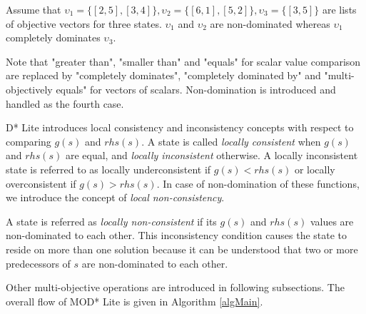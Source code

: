 \documentclass[10pt,journal]{IEEEtran}
\newenvironment{definition}[1][Definition]{\begin{trivlist}
\item[\hskip \labelsep {\bfseries #1}]}{\end{trivlist}}
\begin{document}
Assume that $\upsilon_{1}=\{[2,5],[3,4]\}, \upsilon_{2}=\{[6,1],[5,2]\}, \upsilon_{3}=\{[3,5]\}$ are lists of objective vectors for three states. $\upsilon_{1}$ and $\upsilon_{2}$ are non-dominated whereas $\upsilon_{1}$ completely dominates $\upsilon_{3}$. 

Note that "greater than", "smaller than" and "equals" for scalar value comparison are replaced by "completely dominates", "completely dominated by" and "multi-objectively equals" for vectors of scalars. Non-domination is introduced and handled as the fourth case.

D* Lite introduces local consistency and inconsistency concepts with respect to comparing $g(s)$ and $rhs(s)$. A state is called {\it locally consistent} when $g(s)$ and $rhs(s)$ are equal, and {\it locally inconsistent} otherwise. A locally inconsistent state is referred to as locally underconsistent if $g(s)<rhs(s)$ or locally overconsistent if $g(s)>rhs(s)$. In case of non-domination of these functions, we introduce the concept of {\it local non-consistency}.

\begin{definition}
A state is referred as \textit{locally non-consistent} if its $g(s)$ and $rhs(s)$ values are non-dominated to each other. This inconsistency condition causes the state to reside on more than one solution because it can be understood that two or more predecessors of $s$ are non-dominated to each other.
\end{definition}

Other multi-objective operations are introduced in following subsections. The overall flow of MOD* Lite is given in Algorithm \ref{algMain}.
\end{document}
